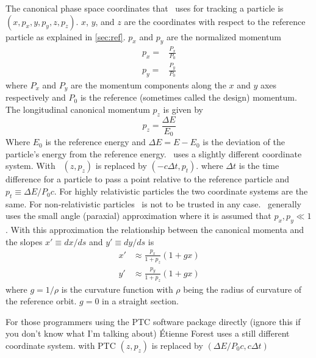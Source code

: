 The canonical phase space coordinates that \bmad\ uses for tracking a
particle is $(x, p_x, y, p_y, z, p_z)$. $x$, $y$, and $z$ are the
coordinates with respect to the reference particle as explained in
\ref{sec:ref}. $p_x$ and $p_y$ are the normalized momentum
\begin{align}
  p_x = &\frac{P_x}{P_0} \\
  p_y = &\frac{P_y}{P_0}
\end{align}
where $P_x$ and $P_y$ are the momentum components along the $x$ and
$y$ axes respectively and $P_0$ is the reference (sometimes called the
design) momentum. The longitudinal canonical momentum $p_z$ is given by
\begin{equation}
  p_z = \frac{\Delta E}{E_0}
\end{equation}
Where $E_0$ is the reference energy and $\Delta E = E - E_0$ is the
deviation of the particle's energy from the reference energy. \mad\ uses
a slightly different coordinate system. With \mad\ $(z, p_z)$ is
replaced by $(-c\Delta t, p_t)$. where $\Delta t$ is the time
difference for a particle to pass a point relative to the reference
particle and $p_t \equiv \Delta E / P_0 c$. For highly relativistic
particles the two coordinate systems are the same. For
non-relativistic particles \bmad\ is not to be trusted in any
case. \bmad\ generally uses the small angle (paraxial) approximation
where it is assumed that $p_x, p_y \ll 1$. With this approximation the
relationship between the canonical momenta and the slopes $x' \equiv dx/ds$
and $y' \equiv dy/ds$ is
\begin{align}
  x' &\approx \frac{p_x}{1 + p_z} (1 + g x) \\
  y' &\approx \frac{p_y}{1 + p_z} (1 + g x) 
\end{align}
where $g = 1/\rho$ is the curvature function with $\rho$ being the radius
of curvature of the reference orbit. $g = 0$ in a straight section.

For those programmers using the PTC software package directly (ignore
this if you don't know what I'm talking about) \'Etienne Forest uses a still
different coordinate system. with PTC $(z, p_z)$ is replaced by
$(\Delta E/P_0 c, c \Delta t)$